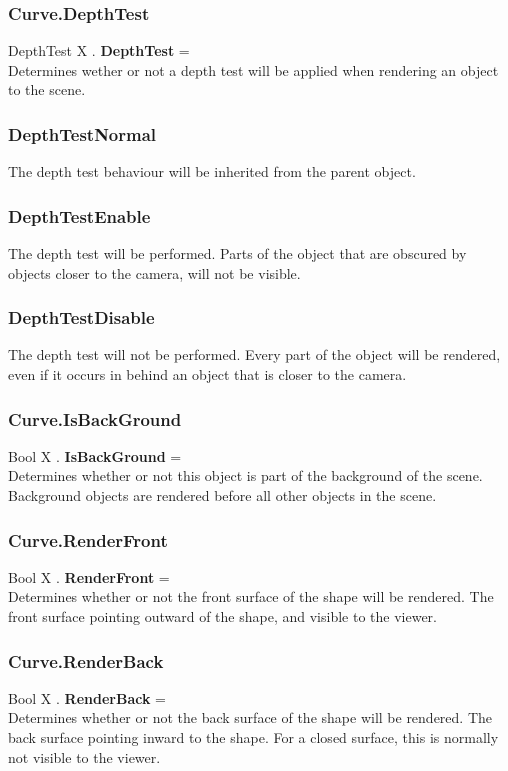 \documentclass[10pt]{book}
\begin{document}
\subsubsection{Curve.DepthTest \label{F:Curve:DepthTest}}
DepthTest X . \textbf{DepthTest} = \\
Determines wether or not a depth test will be applied when rendering an object to the scene.

\subsubsection{DepthTestNormal \label{T:DepthTest|DepthTestNormal}}
The depth test behaviour will be inherited from the parent object.

\subsubsection{DepthTestEnable \label{T:DepthTest|DepthTestEnable}}
The depth test will be performed. Parts of the object that are obscured by objects closer to the camera, will not be visible.

\subsubsection{DepthTestDisable \label{T:DepthTest|DepthTestDisable}}
The depth test will not be performed. Every part of the object will be rendered, even if it occurs in behind an object that is closer to the camera.

\subsubsection{Curve.IsBackGround \label{F:Curve:IsBackGround}}
Bool X . \textbf{IsBackGround} = \\
Determines whether or not this object is part of the background of the scene. Background objects are rendered before all other objects in the scene.

\subsubsection{Curve.RenderFront \label{F:Curve:RenderFront}}
Bool X . \textbf{RenderFront} = \\
Determines whether or not the front surface of the shape will be rendered. The front surface pointing outward of the shape, and visible to the viewer.

\subsubsection{Curve.RenderBack \label{F:Curve:RenderBack}}
Bool X . \textbf{RenderBack} = \\
Determines whether or not the back surface of the shape will be rendered. The back surface pointing inward to the shape. For a closed surface, this is normally not visible to the viewer.
\end{document}
